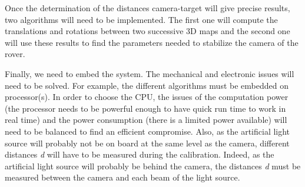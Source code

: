 Once the determination of the distances camera-target will give precise results, two algorithms will need to be implemented. The first one will compute the translations and rotations between two successive 3D maps and the second one will use these results to find the parameters needed to stabilize the camera of the rover.

Finally, we need to embed the system. The mechanical and electronic issues will need to be solved. For example, the different algorithms must be embedded on processor(s). In order to choose the CPU, the issues of the computation power (the processor needs to be powerful enough to have quick run time to work in real time) and the power consumption (there is a limited power available) will need to be balanced to find an efficient compromise. Also, as the artificial light source will probably not be on board at the same level as the camera, different distances \emph{d} will have to be measured during the calibration. Indeed, as the artificial light source will probably be behind the camera, the distances \emph{d} must be measured between the camera and each beam of the light source.